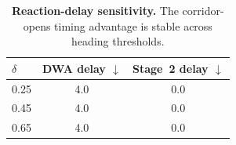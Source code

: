 \begin{table}[t]
\centering
\small
\caption{\textbf{Reaction-delay sensitivity.} The corridor-opens timing advantage is stable across heading thresholds.}
\label{tab:app_rellis_dyn_delay_sensitivity}
\begin{tabular}{lcc}
\toprule
$\delta$ & DWA delay $\downarrow$ & Stage~2 delay $\downarrow$ \\
\midrule
0.25 & 4.0 & 0.0 \\
0.45 & 4.0 & 0.0 \\
0.65 & 4.0 & 0.0 \\
\bottomrule
\end{tabular}
\end{table}
